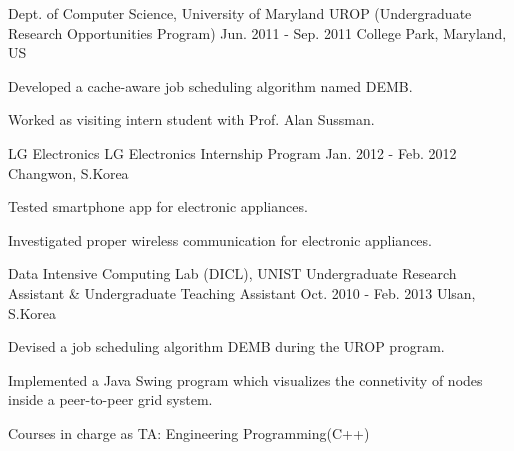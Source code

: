 \begin{cventries}

\cventry
{Dept. of Computer Science, University of Maryland} %
{UROP (Undergraduate Research Opportunities Program)} %
{Jun. 2011 - Sep. 2011} %
{College Park, Maryland, US} %
{ %
\begin{cvitems}
\item {Developed a cache-aware job scheduling algorithm named DEMB.}
\item {Worked as visiting intern student with Prof. Alan Sussman.}
\end{cvitems}
}


\cventry
{LG Electronics} %
{LG Electronics Internship Program} %
{Jan. 2012 - Feb. 2012} %
{Changwon, S.Korea} %
{ %
\begin{cvitems}
\item {Tested smartphone app for electronic appliances.}
\item {Investigated proper wireless communication for electronic appliances.}
\end{cvitems}
}


\cventry
{Data Intensive Computing Lab (DICL), UNIST} %
{Undergraduate Research Assistant \& Undergraduate Teaching Assistant} %
{Oct. 2010 - Feb. 2013} %
{Ulsan, S.Korea} %
{ %
\begin{cvitems}
\item {Devised a job scheduling algorithm DEMB during the UROP program.}
\item {Implemented a Java Swing program which visualizes the connetivity of nodes inside a peer-to-peer grid system.}
\item {Courses in charge as TA: Engineering Programming(C++)}
\end{cvitems} 
}


\end{cventries}
